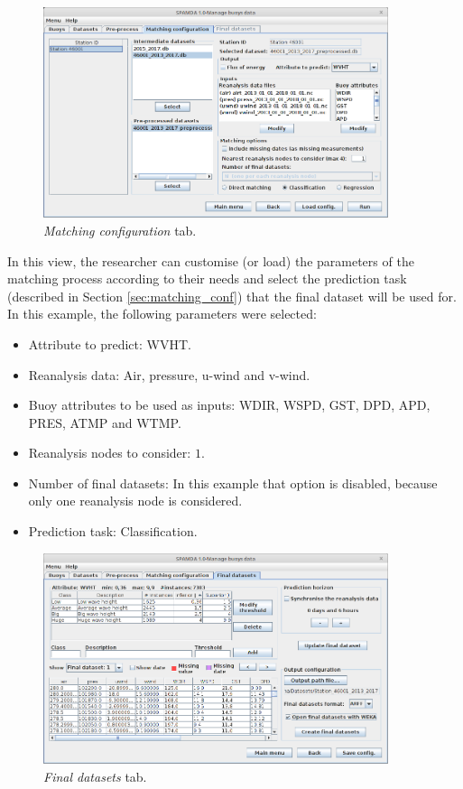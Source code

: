 \documentclass[review]{elsarticle}
\begin{document}
		\begin{figure}[ht!]
			\centering
			\includegraphics[width=0.90\textwidth]{figures/FigureMatching_configuration.png}
			\caption{\textit{Matching configuration} tab.}\label{fig:matching_conf}
		\end{figure}
		
		In this view, the researcher can customise (or load) the parameters of the matching process according to their needs and select the prediction task  (described in Section \ref{sec:matching_conf}) that the final dataset will be used for. In this example, the following parameters were selected:
		\begin{itemize}
			\item Attribute to predict: WVHT.
			\item Reanalysis data: Air, pressure, u-wind and v-wind.
			\item Buoy attributes to be used as inputs: WDIR, WSPD, GST, DPD, APD, PRES, ATMP and WTMP.
			\item Reanalysis nodes to consider: $1$.
			\item Number of final datasets: In this example that option is disabled, because only one reanalysis node is considered.
			\item Prediction task: Classification.
		\end{itemize} 
		
		\begin{figure}[ht!]
			\centering
			\includegraphics[width=0.90\textwidth]{figures/FigureFinal_datasets.png}
			\caption{\textit{Final datasets} tab.}\label{fig:final_dataset}
		\end{figure}
		
\end{document}
